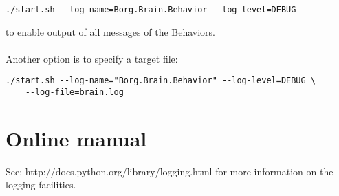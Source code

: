 \documentclass[a4paper, 10pt, oneside]{article}
\begin{document}
\begin{lstlisting}
./start.sh --log-name=Borg.Brain.Behavior --log-level=DEBUG 
\end{lstlisting}
to enable output of all messages of the Behaviors.\\
\\
Another option is to specify a target file:\\
\begin{lstlisting}
./start.sh --log-name="Borg.Brain.Behavior" --log-level=DEBUG \
    --log-file=brain.log
\end{lstlisting}

\section{Online manual}
See: http://docs.python.org/library/logging.html for more information on the logging facilities.
\end{document}

